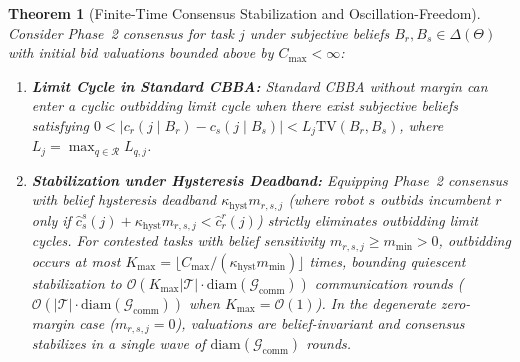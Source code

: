 \documentclass[lettersize,journal]{IEEEtran}
\newtheorem{theorem}{Theorem}
\begin{document}
\begin{theorem}[Finite-Time Consensus Stabilization and Oscillation-Freedom]
Consider Phase~2 consensus for task $j$ under subjective beliefs $B_r, B_s \in \Delta(\Theta)$ with initial bid valuations bounded above by $C_{\max} < \infty$:
\begin{enumerate}
    \item \textbf{Limit Cycle in Standard CBBA:} Standard CBBA without margin can enter a cyclic outbidding limit cycle when there exist subjective beliefs satisfying $0 < |c_r(j \mid B_r) - c_s(j \mid B_s)| < L_j \mathrm{TV}(B_r, B_s)$, where $L_j = \max_{q \in \mathcal{R}} L_{q, j}$.
    \item \textbf{Stabilization under Hysteresis Deadband:} Equipping Phase~2 consensus with belief hysteresis deadband $\kappa_{\text{hyst}} m_{r,s,j}$ (where robot $s$ outbids incumbent $r$ only if $\hat{c}_s^s(j) + \kappa_{\text{hyst}} m_{r,s,j} < \hat{c}_r^r(j)$) strictly eliminates outbidding limit cycles. For contested tasks with belief sensitivity $m_{r,s,j} \ge m_{\min} > 0$, outbidding occurs at most $K_{\max} = \lfloor C_{\max} / (\kappa_{\text{hyst}} m_{\min}) \rfloor$ times, bounding quiescent stabilization to $\mathcal{O}(K_{\max} |\mathcal{T}| \cdot \mathrm{diam}(\mathcal{G}_{\text{comm}}))$ communication rounds ($\mathcal{O}(|\mathcal{T}| \cdot \mathrm{diam}(\mathcal{G}_{\text{comm}}))$ when $K_{\max} = \mathcal{O}(1)$). In the degenerate zero-margin case ($m_{r,s,j} = 0$), valuations are belief-invariant and consensus stabilizes in a single wave of $\mathrm{diam}(\mathcal{G}_{\text{comm}})$ rounds.
\end{enumerate}
\label{thm:stabilization}
\end{theorem}
\end{document}
